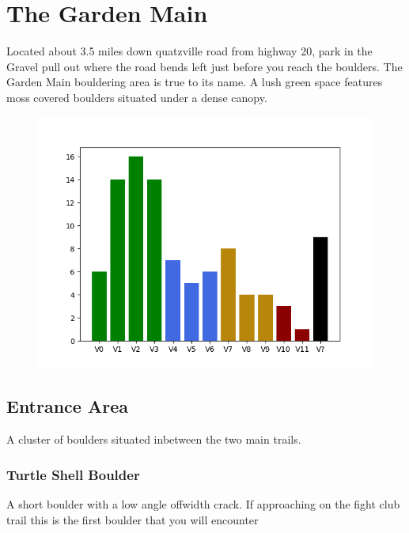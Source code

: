 \chapter{The Garden Main}\label{a:The Garden Main}
\lhead{\textcolor{\chapterColor}{\rule[-2pt]{\textwidth}{15pt}}}
Located about 3.5 miles down quatzville road from highway 20, park in the Gravel pull out where the road bends left just before you reach the boulders. The Garden Main bouldering area is true to its name. A lush green space features moss covered boulders situated under a dense canopy.
\begin{figure}[h]
  \centering
    \includegraphics[width=\linewidth]{./maps/plots/The Garden Main.png}
\end{figure}

\section{Entrance Area}\label{sa:Entrance Area}
A cluster of boulders situated inbetween the two main trails.
\subsection*{Turtle Shell Boulder}\label{bf:Turtle Shell Boulder}
A short boulder with a low angle offwidth crack. If approaching on the fight club trail this is the first boulder that you will encounter

